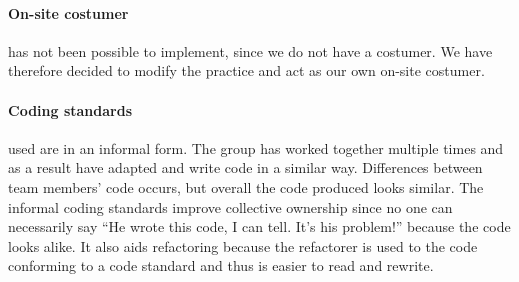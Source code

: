 \paragraph{On-site costumer} has not been possible to implement, since we do not have a costumer. We have therefore decided to modify the practice and act as our own on-site costumer.

\paragraph{Coding standards} used are in an informal form. The group has worked together multiple times and as a result have adapted and write code in a similar way. Differences between team members' code occurs, but overall the code produced looks similar. The informal coding standards improve collective ownership since no one can necessarily say ``He wrote this code, I can tell. It's his problem!'' because the code looks alike. It also aids refactoring because the refactorer is used to the code conforming to a code standard and thus is easier to read and rewrite.
